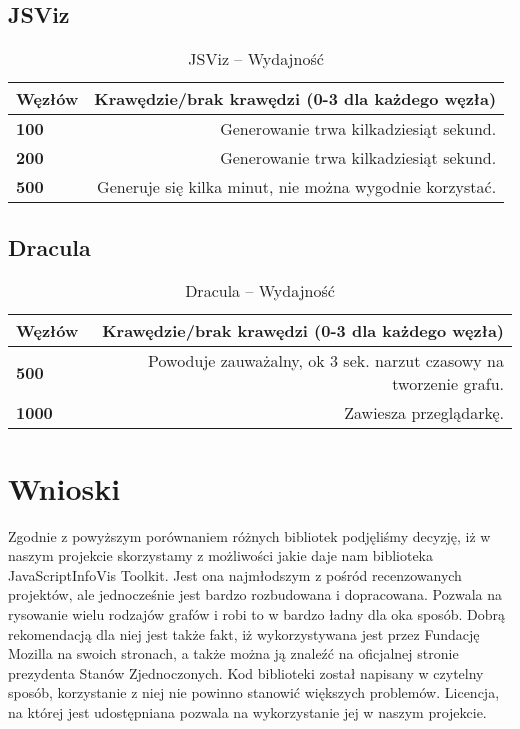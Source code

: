 \subsection{JSViz}

\begin{table}[H]
\begin{tabularx}{\textwidth}{ ||l|R|| }
\hline
\textbf{Węzłów} & \textbf{Krawędzie/brak krawędzi (0-3 dla każdego węzła)} \\
\hline
\textbf{100} & Generowanie trwa kilkadziesiąt sekund. \\
\hline
\textbf{200} & Generowanie trwa kilkadziesiąt sekund.	 \\
\hline
\textbf{500} & Generuje się kilka minut, nie można wygodnie korzystać.  \\
\hline
\end{tabularx}
\caption{JSViz -- Wydajność}
\end{table}

\subsection{Dracula}

\begin{table}[H]
\begin{tabularx}{\textwidth}{ ||l|R|| }
\hline
\textbf{Węzłów} & \textbf{Krawędzie/brak krawędzi (0-3 dla każdego węzła)} \\
\hline
\textbf{500} & Powoduje zauważalny, ok 3 sek. narzut czasowy na tworzenie grafu.  \\
\hline
\textbf{1000} & Zawiesza przeglądarkę. \\
\hline
\end{tabularx}
\caption{Dracula -- Wydajność}
\end{table}

\vfill
\newpage
\section{Wnioski}
Zgodnie z powyższym porównaniem różnych bibliotek podjęliśmy decyzję, iż w naszym projekcie skorzystamy z możliwości jakie daje nam biblioteka JavaScriptInfoVis Toolkit. Jest ona najmłodszym z pośród recenzowanych projektów, ale jednocześnie jest bardzo rozbudowana i dopracowana. Pozwala na rysowanie wielu rodzajów grafów i robi to w bardzo ładny dla oka sposób. Dobrą rekomendacją dla niej jest także fakt, iż wykorzystywana jest przez Fundację Mozilla na swoich stronach, a także można ją znaleźć na oficjalnej stronie prezydenta Stanów Zjednoczonych. Kod biblioteki został napisany w czytelny sposób, korzystanie z niej nie powinno stanowić większych problemów. Licencja, na której jest udostępniana pozwala na wykorzystanie jej w naszym projekcie.